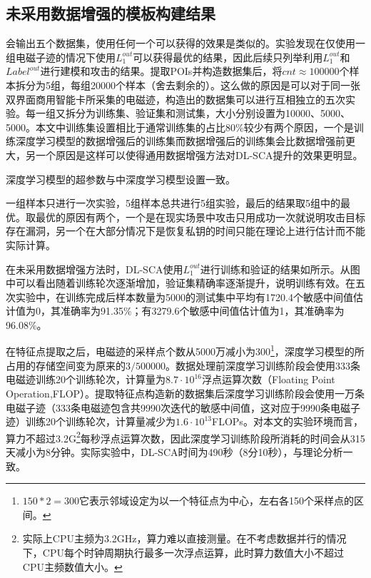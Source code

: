 {{	\subsection{未采用数据增强的模板构建结果}
	会输出五个数据集，使用任何一个可以获得的效果是类似的。实验发现在仅使用一组电磁子迹的情况下使用$L_1^{out}$可以获得最优的结果，因此后续只列举利用$L_1^{out}$和$Label^{out}$进行建模和攻击的结果。提取POIs并构造数据集后，将$cnt\approx100000$个样本拆分为5组，每组20000个样本（舍去剩余的）。这么做的原因是可以对于同一张双界面商用智能卡所采集的电磁迹，构造出的数据集可以进行互相独立的五次实验。每一组又拆分为训练集、验证集和测试集，大小分别设置为10000、5000、5000。本文中训练集设置相比于通常训练集的占比80\%较少有两个原因，一个是训练深度学习模型的数据增强后的训练集而数据增强后的训练集会比数据增强前更大，另一个原因是这样可以使得通用数据增强方法对DL-SCA提升的效果更明显。
	
	深度学习模型的超参数与中深度学习模型设置一致。
	
	一组样本只进行一次实验，5组样本总共进行5组实验，最后的结果取5组中的最优。取最优的原因有两个，一个是在现实场景中攻击只用成功一次就说明攻击目标存在漏洞，另一个在大部分情况下是恢复私钥的时间只能在理论上进行估计而不能实际计算。
	
	在未采用数据增强方法时，DL-SCA使用$L_1^{out}$进行训练和验证的结果如所示。从图中可以看出随着训练轮次逐渐增加，验证集精确率逐渐提升，说明训练有效。在五次实验中，在训练完成后样本数量为5000的测试集中平均有1720.4个敏感中间值估计值为0，其准确率为91.35\%；有3279.6个敏感中间值估计值为1，其准确率为96.08\%。%
	
	在特征点提取之后，电磁迹的采样点个数从5000万减小为300\footnote{$150*2=300$它表示邻域设定为以一个特征点为中心，左右各150个采样点的区间。}，深度学习模型的所占用的存储空间变为原来的$3/500000$。数据处理前深度学习训练阶段会使用333条电磁迹训练20个训练轮次，计算量为$8.7\cdot10^{16}$浮点运算次数（Floating Point Operation,FLOP）。提取特征点构造新的数据集后深度学习训练阶段会使用一万条电磁子迹（333条电磁迹包含共9990次迭代的敏感中间值，这对应于9990条电磁子迹）训练20个训练轮次，计算量减少为$1.6\cdot10^{13}$FLOPs。对本文的实验环境而言，算力不超过3.2G\footnote{实际上CPU主频为3.2GHz，算力难以直接测量。在不考虑数据并行的情况下，CPU每个时钟周期执行最多一次浮点运算，此时算力数值大小不超过CPU主频数值大小。}每秒浮点运算次数，因此深度学习训练阶段所消耗的时间会从315天减小为8分钟。实际实验中，DL-SCA时间为490秒（8分10秒），与理论分析一致。%
	
}}
